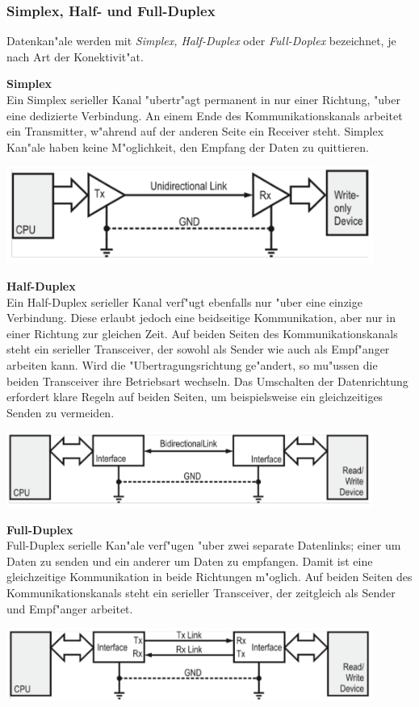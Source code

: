 \newpage
\subsubsection{Simplex, Half- und Full-Duplex}
Datenkan"ale werden mit \textit{Simplex, Half-Duplex} oder \textit{Full-Doplex} bezeichnet, je nach Art der Konektivit"at.

		\textbf{Simplex}\\
		Ein Simplex serieller Kanal "ubertr"agt permanent in nur einer Richtung, "uber eine dedizierte Verbindung. An einem Ende des Kommunikationskanals arbeitet ein
			Transmitter, w"ahrend auf der anderen Seite ein Receiver steht. Simplex Kan"ale haben keine M"oglichkeit, den Empfang der Daten zu quittieren.
		\begin{center}
			\includegraphics[width=12cm]{images/Simplex_serial}
		\end{center}
		

		\textbf{Half-Duplex}\\
		Ein Half-Duplex serieller Kanal verf"ugt ebenfalls nur "uber eine einzige Verbindung. Diese erlaubt jedoch eine beidseitige Kommunikation, aber nur in einer Richtung zur gleichen Zeit. Auf beiden Seiten des Kommunikationskanals steht ein serieller Transceiver, der sowohl als Sender wie auch als Empf"anger arbeiten kann. Wird die "Ubertragungsrichtung ge"andert, so mu"ussen die beiden Transceiver ihre Betriebsart wechseln. Das Umschalten der Datenrichtung erfordert klare Regeln auf beiden Seiten, um beispielsweise ein gleichzeitiges Senden zu vermeiden.
		\begin{center}
			\includegraphics[width=12cm]{images/half_duplex}
		\end{center}
		
	 
	 	\textbf{Full-Duplex}\\
	 	Full-Duplex serielle Kan"ale verf"ugen "uber zwei separate Datenlinks; einer um Daten zu senden und ein anderer um Daten zu empfangen. Damit ist eine gleichzeitige Kommunikation in beide Richtungen m"oglich. Auf beiden Seiten des Kommunikationskanals steht ein serieller Transceiver, der zeitgleich als Sender und Empf"anger arbeitet.
	 	\begin{center}
			\includegraphics[width=12cm]{images/full_duplex}
		\end{center}


